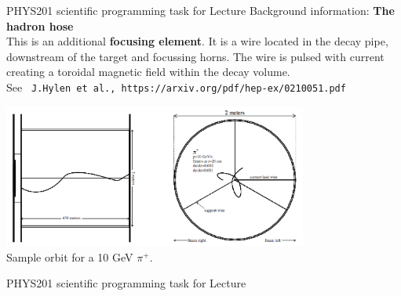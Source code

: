 {\begin{frame}{PHYS201 scientific programming task for Lecture \thislecture}
  Background information: {\bf The hadron hose}\\
  \vspace{0.3cm}
  {\small
  This is an additional {\bf focusing element}.
  It is a wire located in the decay pipe, downstream of the target and
  focussing horns. The wire is pulsed with current creating a toroidal
  magnetic field within the decay volume.\\
  See {\tt \color{blue} J.Hylen et al., https://arxiv.org/pdf/hep-ex/0210051.pdf}\\
  }
  \vspace{0.3cm}
  \begin{center}
    \includegraphics[width=0.75\textwidth]{./images/schematics/hadron_hose_trajectories.png}\\
    {\scriptsize Sample orbit for a 10 GeV $\pi^{+}$.}
  \end{center}
\end{frame}


%
%
%

\begin{frame}{PHYS201 scientific programming task for Lecture \thislecture}


\end{frame}}
